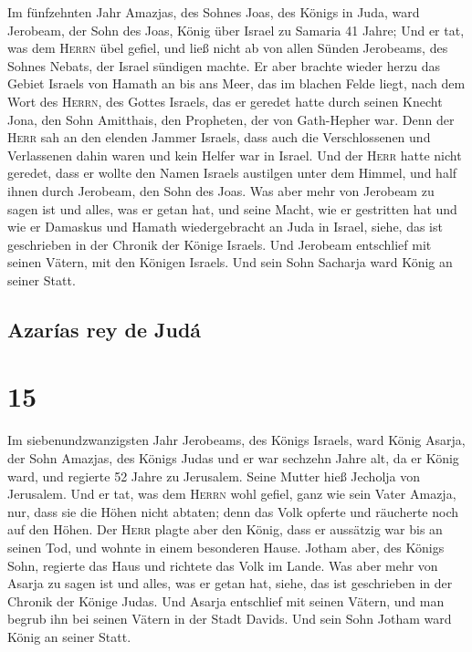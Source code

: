  Im fünfzehnten Jahr Amazjas, des Sohnes Joas, des Königs
in Juda, ward Jerobeam, der Sohn des Joas, König über Israel zu Samaria
41 Jahre;  Und er tat, was dem \textsc{Herrn} übel
gefiel, und ließ nicht ab von allen Sünden Jerobeams, des Sohnes Nebats,
der Israel sündigen machte.  Er aber brachte wieder herzu
das Gebiet Israels von Hamath an bis ans Meer, das im blachen Felde
liegt, nach dem Wort des \textsc{Herrn}, des Gottes Israels, das er
geredet hatte durch seinen Knecht Jona, den Sohn Amitthais, den
Propheten, der von Gath-Hepher war.  Denn der
\textsc{Herr} sah an den elenden Jammer Israels, dass auch die
Verschlossenen und Verlassenen dahin waren und kein Helfer war in
Israel.  Und der \textsc{Herr} hatte nicht geredet, dass
er wollte den Namen Israels austilgen unter dem Himmel, und half ihnen
durch Jerobeam, den Sohn des Joas.  Was aber mehr von
Jerobeam zu sagen ist und alles, was er getan hat, und seine Macht, wie
er gestritten hat und wie er Damaskus und Hamath wiedergebracht an Juda
in Israel, siehe, das ist geschrieben in der Chronik der Könige Israels.
 Und Jerobeam entschlief mit seinen Vätern, mit den
Königen Israels. Und sein Sohn Sacharja ward König an seiner Statt.

\hypertarget{azaruxedas-rey-de-juduxe1}{%
\subsection{Azarías rey de Judá}\label{azaruxedas-rey-de-juduxe1}}

\hypertarget{section-14}{%
\section{15}\label{section-14}}

 Im siebenundzwanzigsten Jahr Jerobeams, des Königs
Israels, ward König Asarja, der Sohn Amazjas, des Königs Judas
 und er war sechzehn Jahre alt, da er König ward, und
regierte 52 Jahre zu Jerusalem. Seine Mutter hieß Jecholja von
Jerusalem.  Und er tat, was dem \textsc{Herrn} wohl
gefiel, ganz wie sein Vater Amazja,  nur, dass sie die
Höhen nicht abtaten; denn das Volk opferte und räucherte noch auf den
Höhen.  Der \textsc{Herr} plagte aber den König, dass er
aussätzig war bis an seinen Tod, und wohnte in einem besonderen Hause.
Jotham aber, des Königs Sohn, regierte das Haus und richtete das Volk im
Lande.  Was aber mehr von Asarja zu sagen ist und alles,
was er getan hat, siehe, das ist geschrieben in der Chronik der Könige
Judas.  Und Asarja entschlief mit seinen Vätern, und man
begrub ihn bei seinen Vätern in der Stadt Davids. Und sein Sohn Jotham
ward König an seiner Statt.

